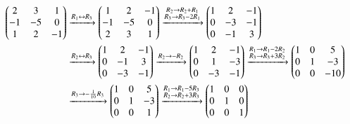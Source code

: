 \documentclass[journal]{IEEEtran}
\begin{document}
\begin{align*}
    \begin{pmatrix}2 & 3 & 1 \\ -1 & -5 & 0 \\ 1 & 2 & -1\end{pmatrix} 
    &\xrightarrow{R_1 \leftrightarrow R_3} \begin{pmatrix}1 & 2 & -1 \\ -1 & -5 & 0 \\ 2 & 3 & 1\end{pmatrix} 
    \xrightarrow{\substack{R_2 \to R_2 + R_1 \\ R_3 \to R_3 - 2R_1}} \begin{pmatrix}1 & 2 & -1 \\ 0 & -3 & -1 \\ 0 & -1 & 3\end{pmatrix} \\
    &\xrightarrow{R_2 \leftrightarrow R_3} \begin{pmatrix}1 & 2 & -1 \\ 0 & -1 & 3 \\ 0 & -3 & -1\end{pmatrix}
    \xrightarrow{R_2 \to -R_2} \begin{pmatrix}1 & 2 & -1 \\ 0 & 1 & -3 \\ 0 & -3 & -1\end{pmatrix} 
    \xrightarrow{\substack{R_1 \to R_1 - 2R_2 \\ R_3 \to R_3 + 3R_2}} \begin{pmatrix}1 & 0 & 5 \\ 0 & 1 & -3 \\ 0 & 0 & -10\end{pmatrix} \\
    &\xrightarrow{R_3 \to -\frac{1}{10}R_3} \begin{pmatrix}1 & 0 & 5 \\ 0 & 1 & -3 \\ 0 & 0 & 1\end{pmatrix} 
    \xrightarrow{\substack{R_1 \to R_1 - 5R_3 \\ R_2 \to R_2 + 3R_3}} \begin{pmatrix}1 & 0 & 0 \\ 0 & 1 & 0 \\ 0 & 0 & 1\end{pmatrix}
\end{align*}
\end{document}

